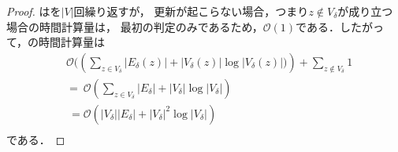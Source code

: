 \begin{proof}
  はを$\lvert V\rvert$回繰り返すが，
  更新が起こらない場合，つまり$z\notin V_\delta$が成り立つ場合の時間計算量は，
  最初の判定のみであるため，$\mathcal{O}(1)$である．したがって，の時間計算量は
  \begin{equation*}
    \begin{aligned}
      &\mathcal{O}(\left(
        \sum_{z\in V_\delta}\lvert E_\delta(z)\rvert+\lvert V_\delta(z)\rvert\log\lvert V_\delta(z)\rvert)
        \right)+\sum_{z\notin V_\delta}1 \nonumber\\
      &=\:\mathcal{O}(\sum_{z\in V_\delta}\lvert E_\delta\rvert
      +\lvert V_\delta\rvert\log\lvert V_\delta\rvert)\nonumber\\
      &\:=\mathcal{O}(\lvert V_\delta\rvert\lvert E_\delta\rvert
      +\lvert V_\delta\rvert^2\log\lvert V_\delta\rvert) \nonumber\\
    \end{aligned}
  \end{equation*}
  である．
\end{proof}
